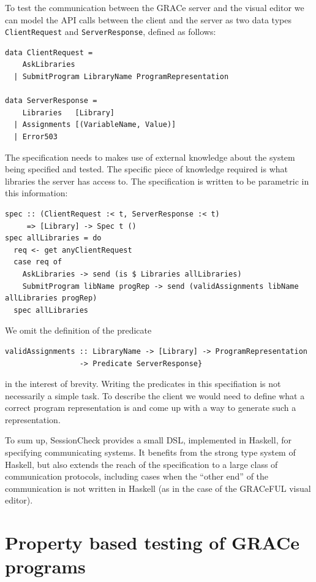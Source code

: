 \documentclass{article}
\begin{document}
To test the communication between the GRACe server and the visual editor we can model
the API calls between the client and the server as
two data types \texttt{ClientRequest} and
\texttt{ServerResponse}, defined as follows:
%
\begin{verbatim}
data ClientRequest =
    AskLibraries
  | SubmitProgram LibraryName ProgramRepresentation

data ServerResponse =
    Libraries   [Library]
  | Assignments [(VariableName, Value)]
  | Error503
\end{verbatim}

The specification needs to makes use of external knowledge about the system
being specified and tested.
%
The specific piece of knowledge required is what libraries the server has access
to.
%
The specification is written to be parametric in this information:

\begin{verbatim}
spec :: (ClientRequest :< t, ServerResponse :< t)
     => [Library] -> Spec t ()
spec allLibraries = do
  req <- get anyClientRequest
  case req of
    AskLibraries -> send (is $ Libraries allLibraries)
    SubmitProgram libName progRep -> send (validAssignments libName allLibraries progRep)
  spec allLibraries
\end{verbatim}

We omit the definition of the predicate
\begin{verbatim}
validAssignments :: LibraryName -> [Library] -> ProgramRepresentation 
                 -> Predicate ServerResponse}
\end{verbatim}
in the interest of brevity.
%
Writing the predicates in this specifiation is not necessarily a simple task.
%
To describe the client we would need to define what a correct program representation is
and come up with a way to generate such a representation.

To sum up, SessionCheck provides a small DSL, implemented in Haskell,
for specifying communicating systems.
%
It benefits from the strong type system of Haskell, but also extends
the reach of the specification to a large class of communication
protocols, including cases when the ``other end'' of the communication
is not written in Haskell (as in the case of the GRACeFUL visual
editor).

\section{Property based testing of GRACe programs}
\label{sec:GCMP}
\end{document}
